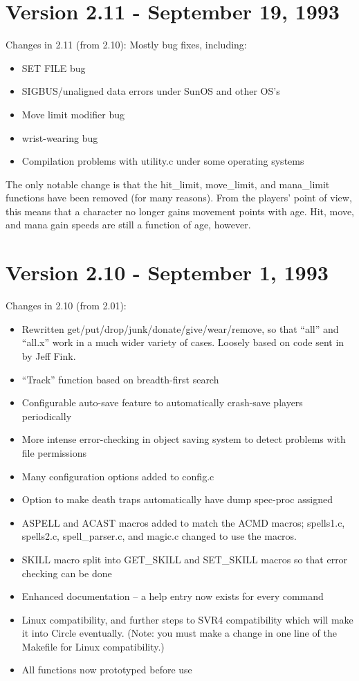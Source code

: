 \documentclass[11pt]{article}
\begin{document}
\section{Version 2.11 - September 19, 1993}
Changes in 2.11 (from 2.10):\newline
Mostly bug fixes, including:
\begin{itemize}
\item SET FILE bug
\item SIGBUS/unaligned data errors under SunOS and other OS's
\item Move limit modifier bug
\item wrist-wearing bug
\item Compilation problems with utility.c under some operating systems
\end{itemize}
The only notable change is that the hit\_limit, move\_limit, and mana\_limit functions have been removed (for many reasons).  From the players' point of view, this means that a character no longer gains movement points with age. Hit, move, and mana gain speeds are still a function of age, however.

\section{Version 2.10 - September 1, 1993}
Changes in 2.10 (from 2.01):
\begin{itemize}
\item Rewritten get/put/drop/junk/donate/give/wear/remove, so that ``all'' and ``all.x'' work in a much wider variety of cases.  Loosely based on code sent in by Jeff Fink.
\item ``Track'' function based on breadth-first search
\item Configurable auto-save feature to automatically crash-save players periodically
\item More intense error-checking in object saving system to detect problems with file permissions
\item Many configuration options added to config.c
\item  Option to make death traps automatically have dump spec-proc assigned
\item ASPELL and ACAST macros added to match the ACMD macros; spells1.c, spells2.c, spell\_parser.c, and magic.c changed to use the macros.
\item SKILL macro split into GET\_SKILL and SET\_SKILL macros so that error checking can be done
\item Enhanced documentation -- a help entry now exists for every command
\item Linux compatibility, and further steps to SVR4 compatibility which will make it into Circle eventually.  (Note: you must make a change in one line of the Makefile for Linux compatibility.)
\item All functions now prototyped before use
\end{itemize}
\end{document}
